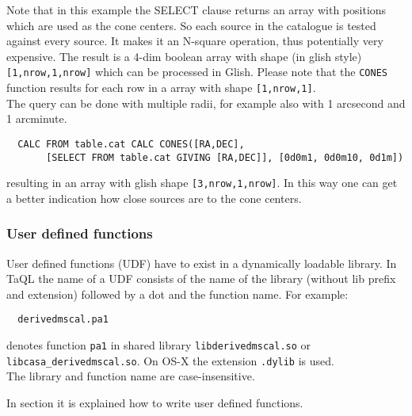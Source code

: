Note that in this example the SELECT clause returns an array with positions
which are used as the cone centers. So each source in the catalogue is
tested against every source. It makes it an N-square operation, thus
potentially very expensive.
The result is a 4-dim boolean array with shape (in glish style)
\texttt{[1,nrow,1,nrow]} which can be processed in Glish. Please note
that the \texttt{CONES} function results for 
each row in a array with shape \texttt{[1,nrow,1]}.
\\The query can be done with multiple radii, for example also
with 1 arcsecond and 1 arcminute.
\begin{verbatim}
  CALC FROM table.cat CALC CONES([RA,DEC],
       [SELECT FROM table.cat GIVING [RA,DEC]], [0d0m1, 0d0m10, 0d1m])
\end{verbatim}
resulting in an array with glish shape \texttt{[3,nrow,1,nrow]}.
In this way one can get a better indication how close sources are to
the cone centers.

\subsubsection{\label{TAQL:UDF}User defined functions}
User defined functions (UDF) have to exist in a dynamically loadable
library. In TaQL the name of a UDF consists of the name of the
library (without  lib prefix and extension) followed by a dot and the function name.
For example:
\begin{verbatim}
  derivedmscal.pa1
\end{verbatim}
denotes function \texttt{pa1} in shared library
\texttt{libderivedmscal.so} or \texttt{libcasa\_derivedmscal.so}. On
OS-X the extension \texttt{.dylib} is used.
\\The library and function name are case-insensitive.

 In section
 it is
explained how to write user defined functions.

